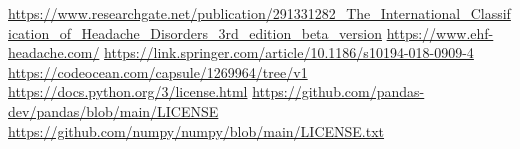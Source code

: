 \begin{thebibliography}{10}
     \url{https://www.researchgate.net/publication/291331282_The_International_Classification_of_Headache_Disorders_3rd_edition_beta_version}
     \url{https://www.ehf-headache.com/}
     \url{https://link.springer.com/article/10.1186/s10194-018-0909-4}
     \url{https://codeocean.com/capsule/1269964/tree/v1}
     \url{https://docs.python.org/3/license.html}
     \url{https://github.com/pandas-dev/pandas/blob/main/LICENSE}
     \url{https://github.com/numpy/numpy/blob/main/LICENSE.txt}
\end{thebibliography}